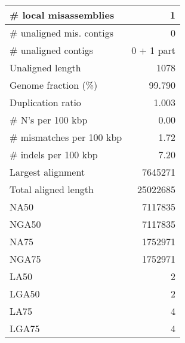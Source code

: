 \documentclass[12pt,a4paper]{article}
\begin{document}
\begin{table}[ht]
\begin{center}
\begin{tabular}{|l*{1}{|r}|}
\# local misassemblies & 1 \\ \hline
\# unaligned mis. contigs & 0 \\ \hline
\# unaligned contigs & 0 + 1 part \\ \hline
Unaligned length & 1078 \\ \hline
Genome fraction (\%) & 99.790 \\ \hline
Duplication ratio & 1.003 \\ \hline
\# N's per 100 kbp & 0.00 \\ \hline
\# mismatches per 100 kbp & 1.72 \\ \hline
\# indels per 100 kbp & 7.20 \\ \hline
Largest alignment & 7645271 \\ \hline
Total aligned length & 25022685 \\ \hline
NA50 & 7117835 \\ \hline
NGA50 & 7117835 \\ \hline
NA75 & 1752971 \\ \hline
NGA75 & 1752971 \\ \hline
LA50 & 2 \\ \hline
LGA50 & 2 \\ \hline
LA75 & 4 \\ \hline
LGA75 & 4 \\ \hline
\end{tabular}
\end{center}
\end{table}
\end{document}
